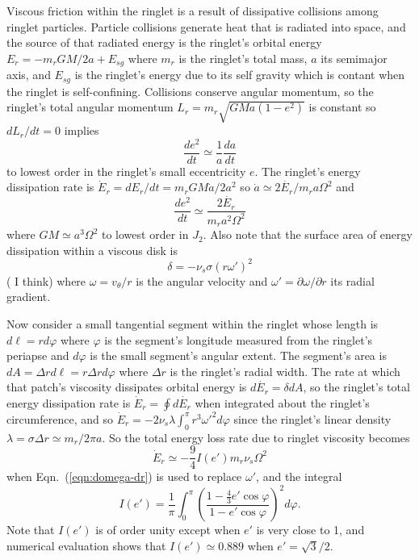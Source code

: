 \documentclass[preprint]{aastex62}
\begin{document}
Viscous friction within the ringlet is a result of dissipative collisions among ringlet particles.
Particle collisions generate heat that is radiated into space, and the source of that radiated energy
is the ringlet's orbital energy $E_r=-m_rGM/2a + E_{sg}$ where $m_r$ is the ringlet's total
mass, $a$ its semimajor axis, and $E_{sg}$ is the ringlet's energy due to its self gravity
which is contant when the ringlet is self-confining. 
Collisions conserve angular momentum, so the ringlet's total angular momentum
$L_r=m_r\sqrt{GMa(1-e^2)}$ is constant so $dL_r/dt=0$ implies
\begin{equation}
    \label{eqn:e2-dot}
    \frac{de^2}{dt} \simeq \frac{1}{a}\frac{da}{dt}
\end{equation}
to lowest order in the ringlet's small eccentricity $e$.
The ringlet's energy dissipation rate is $\dot{E}_r = dE_r/dt=m_rGM\dot{a}/2a^2$ so
$\dot{a}\simeq2\dot{E_r}/m_ra\Omega^2$ and 
\begin{equation}
    \label{eqn:de2/dt}
    \frac{de^2}{dt} \simeq \frac{2\dot{E_r}}{m_r a^2\Omega^2}
\end{equation}
where $GM\simeq a^3\Omega^2$ to lowest order in $J_2$. Also note that
the surface area of energy dissipation within a viscous disk is
\begin{equation}
    \delta = -\nu_s\sigma(r\omega')^2
\end{equation}
(\citealt{P81} I think) where $\omega=v_\theta/r$ is the angular velocity and 
$\omega'=\partial\omega/\partial r$ its radial gradient.

Now consider a small tangential segment within the ringlet whose length is $d\ell=rd\varphi$ where 
$\varphi$ is the segment's longitude measured from the ringlet's periapse and
$d\varphi$ is the small segment's angular extent. The segment's area is 
$dA=\Delta rd\ell=r\Delta r d\varphi$
where $\Delta r$ is the ringlet's radial width.
The rate at which that patch's viscosity dissipates orbital energy is $d\dot{E_r}=\delta dA$, so
the ringlet's total energy dissipation rate is 
$\dot{E}_r = \oint d\dot{E_r}$ when integrated about the ringlet's circumference, and so
$\dot{E}_r = -2\nu_s\lambda\int_0^\pi r^3\omega'^2d\varphi$
since the ringlet's linear density $\lambda=\sigma\Delta r\simeq m_r/2\pi a$. So the
total energy loss rate due to ringlet viscosity becomes
\begin{equation}
    \label{eqn:dE_r/dt}
    \dot{E}_r \simeq -\frac{9}{4}I(e')m_r\nu_s\Omega^2
\end{equation}
when Eqn.\ (\ref{eqn:domega-dr}) is used to replace $\omega'$, and the integral 
\begin{equation}
    I(e') =  \frac{1}{\pi}\int_0^\pi\left(\frac{1-\frac{4}{3}e'\cos\varphi}{1-e'\cos\varphi}\right)^2d\varphi .
\end{equation}
Note that  $I(e')$ is of order
unity except when $e'$ is very close to 1, and numerical evaluation shows that $I(e')\simeq0.889$
when $e'=\sqrt{3}/2$.
\end{document}
